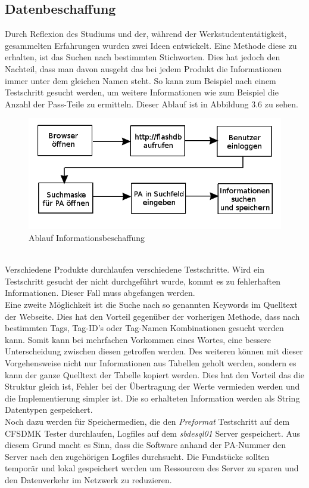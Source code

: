 	\vspace{5mm}

\subsection{Datenbeschaffung}
Durch Reflexion des Studiums und der, während der Werkstudententätigkeit, gesammelten Erfahrungen wurden zwei Ideen entwickelt. Eine Methode diese zu erhalten, ist das Suchen nach bestimmten Stichworten. Dies hat jedoch den Nachteil, dass man davon ausgeht das bei jedem Produkt die Informationen immer unter dem gleichen Namen steht. So kann zum Beispiel nach einem Testschritt gesucht werden, um weitere Informationen wie zum Beispiel die Anzahl der Pass-Teile zu ermitteln. Dieser Ablauf ist in Abbildung 3.6 zu sehen.
\begin{figure}[!htbp]
\centering
\includegraphics[scale=0.5]{images/ablauf01}
\caption{Ablauf Informationsbeschaffung}
\label{fig:Ablaufskizze}
\end{figure}
\\
Verschiedene Produkte durchlaufen verschiedene Testschritte. Wird ein Testschritt gesucht der nicht durchgeführt wurde, kommt es zu fehlerhaften Informationen. Dieser Fall muss abgefangen werden. \\
Eine zweite Möglichkeit ist die Suche nach so genannten Keywords im Quelltext der Webseite. Dies hat den Vorteil gegenüber der vorherigen Methode, dass nach bestimmten Tags, Tag-ID's oder Tag-Namen Kombinationen gesucht werden kann. Somit kann bei mehrfachen Vorkommen eines Wortes, eine bessere Unterscheidung zwischen diesen getroffen werden. Des weiteren können mit dieser Vorgehensweise nicht nur Informationen aus Tabellen geholt werden, sondern es kann der ganze Quelltext der Tabelle kopiert werden. Dies hat den Vorteil das die Struktur gleich ist, Fehler bei der Übertragung der Werte vermieden werden und die Implementierung simpler ist. Die so erhalteten Information werden als String Datentypen gespeichert. \\
Noch dazu werden für Speichermedien, die den \textit{Preformat} Testschritt auf dem \ac{CFSDMK} Tester durchlaufen, Logfiles auf dem \textit{sbdesql01} Server gespeichert. Aus diesem Grund macht es Sinn, dass die Software anhand der \ac{PA}-Nummer den Server nach den zugehörigen Logfiles durchsucht. Die Fundstücke sollten temporär und lokal gespeichert werden um Ressourcen des Server zu sparen und den Datenverkehr im Netzwerk zu reduzieren.

